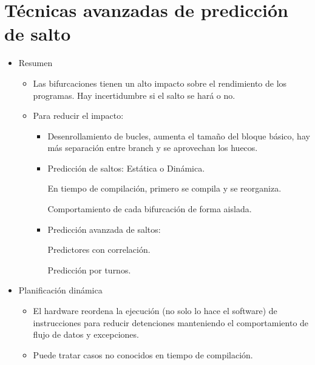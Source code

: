 \documentclass[12pt, twoside, openright]{report} %
\begin{document}
\section{Técnicas avanzadas de predicción de salto}

\begin{itemize}
	\item Resumen

	      \begin{itemize}

		      \item Las bifurcaciones tienen un alto impacto sobre el rendimiento de
		            los programas. Hay incertidumbre si el salto se hará o no.
		      \item Para reducir el impacto:

		            \begin{itemize}

			            \item Desenrollamiento de bucles, aumenta el tamaño del bloque básico,
			                  hay más separación entre branch y se aprovechan los huecos.
			            \item Predicción de saltos: Estática o Dinámica.


			                  En tiempo de compilación, primero se compila y se reorganiza.

			                  Comportamiento de cada bifurcación de forma aislada.
			            \item Predicción avanzada de saltos:


			                  Predictores con correlación.

			                  Predicción por turnos.
		            \end{itemize}
	      \end{itemize}
	      \pagebreak
	\item Planificación dinámica

	      \begin{itemize}

		      \item El hardware reordena la ejecución (no solo lo hace el software) de
		            instrucciones para reducir detenciones manteniendo el
		            comportamiento de flujo de datos y excepciones.
		      \item Puede tratar casos no conocidos en tiempo de compilación.

		            \begin{itemize}


\end{itemize}
\end{itemize}
\end{itemize}
\end{document}
